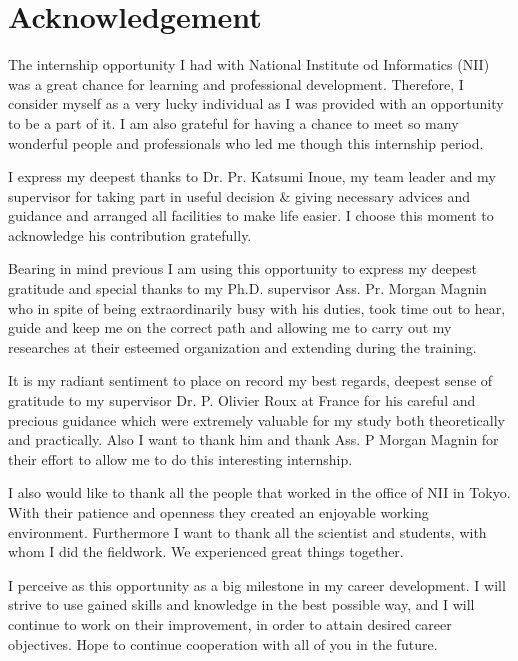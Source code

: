 \section*{Acknowledgement}

The internship opportunity I had with National Institute od Informatics (NII) was a great chance for learning and professional development. Therefore, I consider myself as a very lucky individual as I was provided with an opportunity to be a part of it. I am also grateful for having a chance to meet so many wonderful people and professionals who led me though this internship period.

I express my deepest thanks to Dr. Pr. Katsumi Inoue, my team leader and my supervisor for taking part in useful decision \& giving necessary advices and guidance and arranged all facilities to make life easier. I choose this moment to acknowledge his contribution gratefully.

Bearing in mind previous I am using this opportunity to express my deepest gratitude and special thanks to my Ph.D. supervisor Ass. Pr. Morgan Magnin who in spite of being extraordinarily busy with his duties, took time out to hear, guide and keep me on the correct path and allowing me to carry out my researches at their esteemed organization and extending during the training.

It is my radiant sentiment to place on record my best regards, deepest sense of gratitude to my supervisor Dr. P. Olivier Roux at France for his careful and precious guidance which were extremely valuable for my study both theoretically and practically. Also I want to thank him and thank Ass. P Morgan Magnin for their effort to allow me to do this interesting internship.

I also would like to thank all the people that worked in the office of NII in Tokyo. With their
patience and openness they created an enjoyable working environment.
Furthermore I want to thank all the scientist and students, with whom I did the fieldwork. We
experienced great things together.

I perceive as this opportunity as a big milestone in my career development. I will strive to use gained skills and knowledge in the best possible way, and I will continue to work on their improvement, in order to attain desired career objectives. Hope to continue cooperation with all of you in the future.


